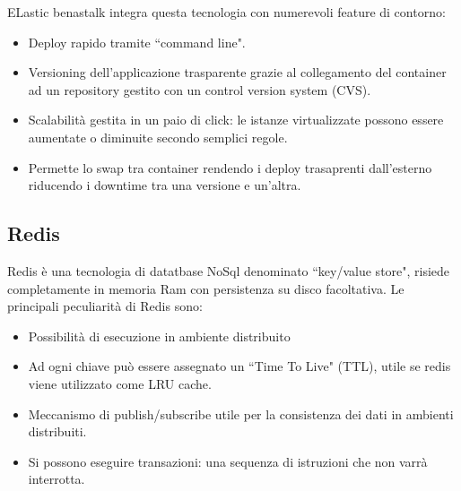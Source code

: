 ELastic benastalk integra questa tecnologia con numerevoli feature di contorno: 
\begin{itemize}
	\item Deploy rapido tramite ``command line".
	\item Versioning dell'applicazione trasparente grazie al collegamento del container ad un repository gestito con un control version system (CVS).
	\item Scalabilità gestita in un paio di click: le istanze virtualizzate possono essere aumentate o diminuite secondo semplici regole.
	\item Permette lo swap tra container rendendo i deploy trasaprenti dall'esterno riducendo i downtime tra una versione e un'altra.
\end{itemize}

\subsection{Redis}
Redis è una tecnologia di datatbase NoSql denominato ``key/value store", risiede completamente in memoria Ram con persistenza su disco facoltativa. Le principali peculiarità di Redis sono:
\begin{itemize}
	\item Possibilità di esecuzione in ambiente distribuito
	\item Ad ogni chiave può essere assegnato un ``Time To Live" (TTL), utile se redis viene utilizzato come LRU cache.
	\item Meccanismo di publish/subscribe utile per la consistenza dei dati in ambienti distribuiti.
	\item Si possono eseguire transazioni: una sequenza di istruzioni che non varrà interrotta.
\end{itemize}

